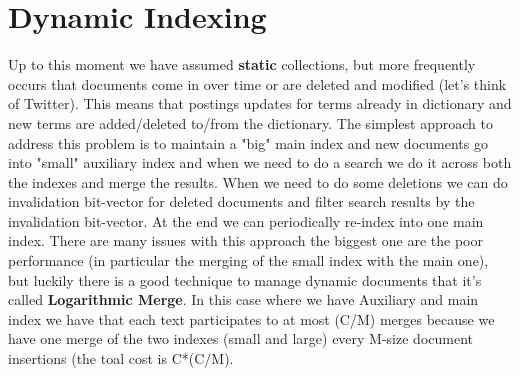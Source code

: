 \section{Dynamic Indexing}
Up to this moment we have assumed \textbf{static} collections, but more frequently occurs that documents come in over time or are deleted and modified (let's think of Twitter). This means that postings updates for terms already in dictionary and new terms are added/deleted to/from the dictionary.\newline
The simplest approach to address this problem is to maintain a "big" main index and new documents go into "small" auxiliary index and when we need to do a search we do it across both the indexes and merge the results.\newline
When we need to do some deletions we can do invalidation bit-vector for deleted documents and filter search results by the invalidation bit-vector. At the end we can periodically re-index into one main index.\newline
There are many issues with this approach the biggest one are the poor performance (in particular the merging of the small index with the main one), but luckily there is a good technique to manage dynamic documents that it's called \textbf{Logarithmic Merge}.
In this case where we have Auxiliary and main index we have that each text participates to at most (C/M) merges because we have one merge of the two indexes (small and large) every M-size document insertions (the toal cost is C*(C/M).\newline
